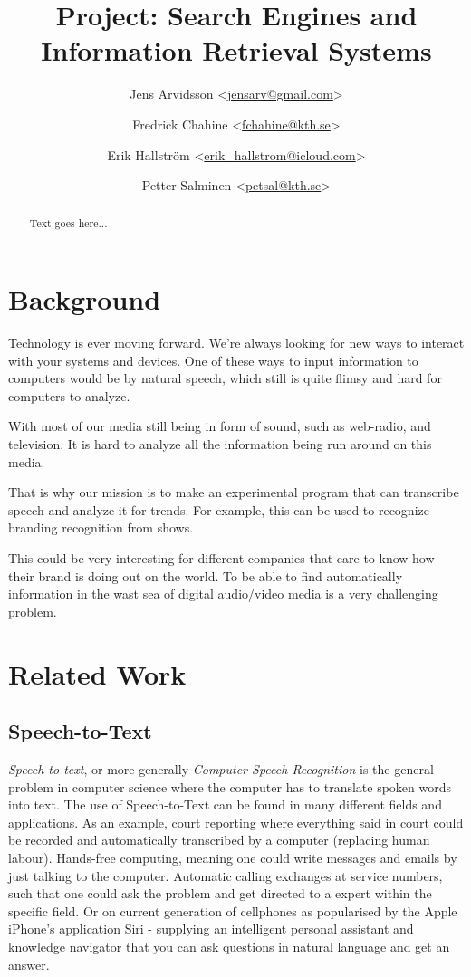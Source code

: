 \documentclass[a4paper,11pt,twoside]{ltxdoc}
\title{Project: Search Engines and Information Retrieval Systems}
\author{
Jens Arvidsson <\href{mailto:jensarv@gmail.com}{jensarv@gmail.com}> \and
Fredrick Chahine <\href{mailto:fchahine@kth.se}{fchahine@kth.se}> \and
Erik Hallström  <\href{mailto:erik_hallstrom@icloud.com}{erik_hallstrom@icloud.com}> \and
Petter Salminen <\href{mailto:petsal@kth.se}{petsal@kth.se}>}
\begin{document}
\maketitle
\tableofcontents

\newpage
\begin{abstract}
Text goes here...

\end{abstract}

\newpage
\section{Background}
Technology is ever moving forward.
We're always looking for new ways to interact with your systems and devices.
One of these ways to input information to computers would be by natural speech,
which still is quite flimsy and hard for computers to analyze. 

With most of our media still being in form of sound, such  as web-radio, and television.
It is hard to analyze all the information being run around on this media. 

That is why our mission is to make an experimental program that can transcribe speech and analyze it for trends.
For example, this can be used to recognize branding recognition from shows.

This could be very interesting for different companies that care to know how their brand is doing out on the world.
To be able to find automatically information in the wast sea of digital audio/video media is a very challenging problem.



\section{Related Work}
\subsection{Speech-to-Text}
\emph{Speech-to-text}, or more generally \emph{Computer Speech Recognition} is the general problem in computer science where the computer has to translate spoken words into text.
The use of Speech-to-Text can be found in many different fields and applications.
As an example, court reporting where everything said in court could be recorded and automatically transcribed by a computer (replacing human labour).
Hands-free computing, meaning one could write messages and emails by just talking to the computer.
Automatic calling exchanges at service numbers,
such that one could ask the problem and get directed to a expert within the specific field.
Or on current generation of cellphones as popularised by the Apple iPhone's application Siri
- supplying an intelligent personal assistant and knowledge navigator that you can ask questions in natural language and get an answer. 
\end{document}
